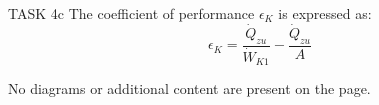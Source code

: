 TASK 4c  
The coefficient of performance \( \epsilon_K \) is expressed as:  
\[
\epsilon_K = \frac{\dot{Q}_{zu}}{\dot{W}_{K1}} - \frac{\dot{Q}_{zu}}{A}
\]  

No diagrams or additional content are present on the page.
